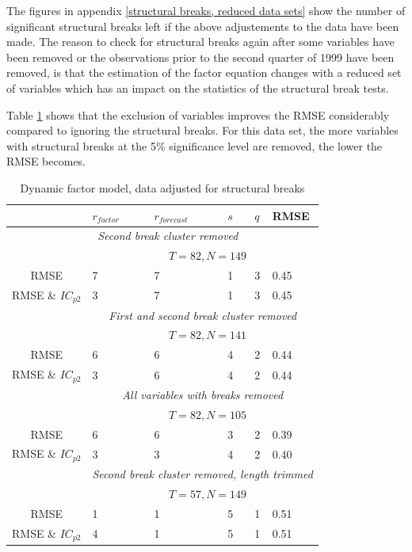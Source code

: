 \documentclass[11pt]{article}
\begin{document}
The figures in appendix \ref{structural breaks, reduced data sets} show the number of significant structural breaks left if the above adjustements to the data have been made. The reason to check for structural breaks again after some variables have been removed or the observations prior to the second quarter of 1999 have been removed, is that the estimation of the factor equation changes with a reduced set of variables which has an impact on the statistics of the structural break tests.

Table \ref{results dynamic factor model, reduced data sets} shows that the exclusion of variables improves the RMSE considerably compared to ignoring the structural breaks. For this data set, the more variables with structural breaks at the 5\% significance level are removed, the lower the RMSE becomes.

\begin{table}[ht]
	\centering
	\begin{tabular}{c|lllll}
		   & $r_{factor}$ & $r_{forecast}$ & $s$ & $q$ & RMSE\\
		 \hline
		 \hline
		  & \multicolumn{3}{c}{\textit{Second break cluster removed}} \\ 
			& & \multicolumn{3}{c}{$T=82, N=149$} \\
		  \hline
		   	RMSE & 7 & 7 & 1 & 3 & 0.45 \\
		   	RMSE \& $IC_{p2}$ & 3 & 7 & 1 & 3 & 0.45 \\
		  \hline
		  \hline
		  & \multicolumn{5}{c}{\textit{First and second break cluster removed}} \\ 
			& & \multicolumn{3}{c}{$T=82, N=141$} \\
		  \hline
		   	RMSE & 6 & 6 & 4 & 2 & 0.44 \\
		   	RMSE \& $IC_{p2}$ & 3 & 6 & 4 & 2 & 0.44 \\
		  \hline
		  \hline
	  	  & \multicolumn{5}{c}{\textit{All variables with breaks removed}} \\ 
			& & \multicolumn{3}{c}{$T=82, N=105$} \\
          \hline
		   	RMSE & 6 & 6 & 3 & 2 & 0.39 \\
		   	RMSE \& $IC_{p2}$ & 3 & 3 & 4 & 2 & 0.40 \\
		  \hline
		  \hline
		  & \multicolumn{5}{c}{\textit{Second break cluster removed, length trimmed}} \\
			& & \multicolumn{3}{c}{$T=57, N=149$} \\
		  \hline
		   	RMSE & 1 & 1 & 5 & 1 & 0.51 \\
		   	RMSE \& $IC_{p2}$ & 4 & 1 & 5 & 1 & 0.51 \\
		  \hline
		  \hline		  
	\end{tabular}
	\caption{Dynamic factor model, data adjusted for structural breaks}
	\label{results dynamic factor model, reduced data sets}
\end{table}
\end{document}
